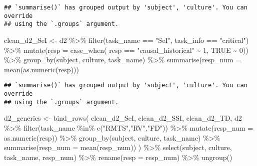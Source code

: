 \documentclass[
]{article}
\newenvironment{Shaded}{\begin{snugshade}}{\end{snugshade}}
\newcommand{\AttributeTok}[1]{\textcolor[rgb]{0.77,0.63,0.00}{#1}}
\newcommand{\ConstantTok}[1]{\textcolor[rgb]{0.00,0.00,0.00}{#1}}
\newcommand{\DecValTok}[1]{\textcolor[rgb]{0.00,0.00,0.81}{#1}}
\newcommand{\FunctionTok}[1]{\textcolor[rgb]{0.00,0.00,0.00}{#1}}
\newcommand{\NormalTok}[1]{#1}
\newcommand{\OtherTok}[1]{\textcolor[rgb]{0.56,0.35,0.01}{#1}}
\newcommand{\SpecialCharTok}[1]{\textcolor[rgb]{0.00,0.00,0.00}{#1}}
\newcommand{\StringTok}[1]{\textcolor[rgb]{0.31,0.60,0.02}{#1}}
\begin{document}
\begin{verbatim}
## `summarise()` has grouped output by 'subject', 'culture'. You can override
## using the `.groups` argument.
\end{verbatim}

\begin{Shaded}
\begin{Highlighting}[]
\NormalTok{clean\_d2\_SeI }\OtherTok{\textless{}{-}}\NormalTok{ d2 }\SpecialCharTok{\%\textgreater{}\%} 
  \FunctionTok{filter}\NormalTok{(task\_name }\SpecialCharTok{==} \StringTok{"SeI"}\NormalTok{, task\_info }\SpecialCharTok{==} \StringTok{"critical"}\NormalTok{) }\SpecialCharTok{\%\textgreater{}\%} 
  \FunctionTok{mutate}\NormalTok{(}\AttributeTok{resp =} \FunctionTok{case\_when}\NormalTok{(}
\NormalTok{    resp }\SpecialCharTok{==} \StringTok{"causal\_historical"} \SpecialCharTok{\textasciitilde{}} \DecValTok{1}\NormalTok{, }
    \ConstantTok{TRUE} \SpecialCharTok{\textasciitilde{}} \DecValTok{0}\NormalTok{)) }\SpecialCharTok{\%\textgreater{}\%} 
  \FunctionTok{group\_by}\NormalTok{(subject, culture, task\_name) }\SpecialCharTok{\%\textgreater{}\%} 
  \FunctionTok{summarise}\NormalTok{(}\AttributeTok{resp\_num =} \FunctionTok{mean}\NormalTok{(}\FunctionTok{as.numeric}\NormalTok{(resp)))}
\end{Highlighting}
\end{Shaded}

\begin{verbatim}
## `summarise()` has grouped output by 'subject', 'culture'. You can override
## using the `.groups` argument.
\end{verbatim}

\begin{Shaded}
\begin{Highlighting}[]
\NormalTok{d2\_generics }\OtherTok{\textless{}{-}} \FunctionTok{bind\_rows}\NormalTok{(}
\NormalTok{                clean\_d2\_SeI, }
\NormalTok{                clean\_d2\_SSI, }
\NormalTok{                clean\_d2\_TD, }
\NormalTok{                d2  }\SpecialCharTok{\%\textgreater{}\%} 
                \FunctionTok{filter}\NormalTok{(task\_name }\SpecialCharTok{\%in\%} \FunctionTok{c}\NormalTok{(}\StringTok{"RMTS"}\NormalTok{,}\StringTok{"RV"}\NormalTok{,}\StringTok{"FD"}\NormalTok{))  }\SpecialCharTok{\%\textgreater{}\%} 
                \FunctionTok{mutate}\NormalTok{(}\AttributeTok{resp\_num =} \FunctionTok{as.numeric}\NormalTok{(resp))  }\SpecialCharTok{\%\textgreater{}\%} 
                 \FunctionTok{group\_by}\NormalTok{(subject, culture, task\_name) }\SpecialCharTok{\%\textgreater{}\%} 
                \FunctionTok{summarise}\NormalTok{(}\AttributeTok{resp\_num =} \FunctionTok{mean}\NormalTok{(resp\_num)) }
\NormalTok{                ) }\SpecialCharTok{\%\textgreater{}\%} 
  \FunctionTok{select}\NormalTok{(subject, culture, task\_name, resp\_num) }\SpecialCharTok{\%\textgreater{}\%} 
  \FunctionTok{rename}\NormalTok{(}\AttributeTok{resp =}\NormalTok{ resp\_num) }\SpecialCharTok{\%\textgreater{}\%} 
  \FunctionTok{ungroup}\NormalTok{()}
\end{Highlighting}
\end{Shaded}
\end{document}
